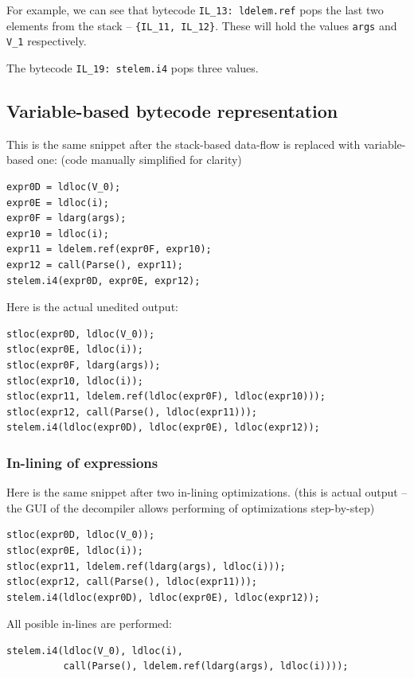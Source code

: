 \documentclass[12pt,twoside,notitlepage]{report}
\begin{document}
For example, we can see that bytecode \verb|IL_13: ldelem.ref| pops 
the last two elements from the stack -- \verb|{IL_11, IL_12}|.
These will hold the values \verb|args| and \verb|V_1| respectively.

The bytecode \verb|IL_19: stelem.i4| pops three values.

\subsection{Variable-based bytecode representation}

This is the same snippet after the stack-based data-flow
is replaced with variable-based one:
(code manually simplified for clarity)

\begin{verbatim}
expr0D = ldloc(V_0);
expr0E = ldloc(i);
expr0F = ldarg(args);
expr10 = ldloc(i);
expr11 = ldelem.ref(expr0F, expr10);
expr12 = call(Parse(), expr11);
stelem.i4(expr0D, expr0E, expr12);
\end{verbatim}

Here is the actual unedited output:

\begin{verbatim}
stloc(expr0D, ldloc(V_0));
stloc(expr0E, ldloc(i));
stloc(expr0F, ldarg(args));
stloc(expr10, ldloc(i));
stloc(expr11, ldelem.ref(ldloc(expr0F), ldloc(expr10)));
stloc(expr12, call(Parse(), ldloc(expr11)));
stelem.i4(ldloc(expr0D), ldloc(expr0E), ldloc(expr12));
\end{verbatim}

\subsubsection{In-lining of expressions}

Here is the same snippet after two in-lining optimizations.
(this is actual output -- the GUI of the decompiler allows performing
of optimizations step-by-step)

\begin{verbatim}
stloc(expr0D, ldloc(V_0));
stloc(expr0E, ldloc(i));
stloc(expr11, ldelem.ref(ldarg(args), ldloc(i)));
stloc(expr12, call(Parse(), ldloc(expr11)));
stelem.i4(ldloc(expr0D), ldloc(expr0E), ldloc(expr12));
\end{verbatim}

All posible in-lines are performed:

\begin{verbatim}
stelem.i4(ldloc(V_0), ldloc(i),
          call(Parse(), ldelem.ref(ldarg(args), ldloc(i))));
\end{verbatim}
\end{document}
